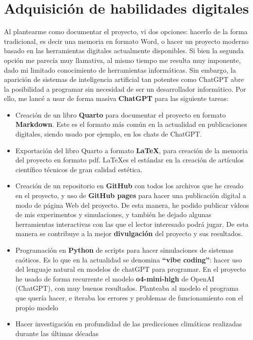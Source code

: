 \documentclass[
  10pt,
  a4paper,
  DIV=11,
  numbers=noendperiod,
  open=any]{scrreprt}
\numberwithin{equation}{chapter}
\numberwithin{equation}{section}
\renewcommand{\[}{\begin{equation}}
\renewcommand{\]}{\end{equation}}
\begin{document}
\section{Adquisición de habilidades
digitales}\label{adquisiciuxf3n-de-habilidades-digitales}

Al plantearme como documentar el proyecto, vi dos opciones: hacerlo de
la forma tradicional, es decir una memoria en formato Word, o hacer un
proyecto moderno basado en las herramientas digitales actualmente
disponibles. Si bien la segunda opción me parecía muy llamativa, al
mismo tiempo me resulta muy imponente, dado mi limitado conocimiento de
herramientas informáticas. Sin embargo, la aparición de sistemas de
inteligencia artificial tan potentes como ChatGPT abre la posibilidad a
programar sin necesidad de ser un desarrollador informático. Por ello,
me lancé a usar de forma masiva \textbf{ChatGPT} para las siguiente
tareas:

\begin{itemize}
\item
  Creación de un libro \textbf{Quarto} para documentar el proyecto en
  formato \textbf{Markdown}. Este es el formato más común en la
  actualidad en publicaciones digitales, siendo usado por ejemplo, en
  los chats de ChatGPT.
\item
  Exportación del libro Quarto a formato \textbf{\LaTeX}, para creación
  de la memoria del proyecto en formato pdf. \LaTeX es el estándar en la
  creación de artículos científico técnicos de gran calidad estética.
\item
  Creación de un repositorio en \textbf{GitHub} con todos los archivos
  que he creado en el proyecto, y uso de \textbf{GitHub pages} para
  hacer una publicación digital a modo de página Web del proyecto. De
  esta manera, he podido publicar vídeos de mis experimentos y
  simulaciones, y también he dejado algunas herramientas interactivas
  con las que el lector interesado podrá jugar. De esta manera se
  contribuye a la mejor \textbf{divulgación} del proyecto y sus
  resultados.
\item
  Programación en \textbf{Python} de scripts para hacer simulaciones de
  sistemas caóticos. Es lo que en la actualidad se denomina
  \textbf{``vibe coding''}: hacer uso del lenguaje natural en modelos de
  chatGPT para programar. En el proyecto he usado de forma recurrente el
  modelo \textbf{o4-mini-high} de OpenAI (ChatGPT), con muy buenos
  resultados. Planteaba al modelo el programa que quería hacer, e
  iteraba los errores y problemas de funcionamiento con el propio modelo
\item
  Hacer investigación en profundidad de las predicciones climáticas
  realizadas durante las últimas décadas
\end{itemize}
\end{document}
